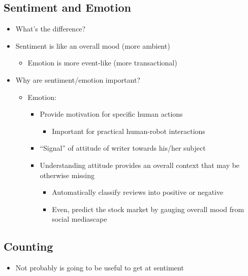 \documentclass[a4paper]{article}
\begin{document}
\subsection{Sentiment and Emotion}
\begin{itemize}
    \item What's the difference?
    \item Sentiment is like an overall mood (more ambient)
    \begin{itemize}[label=$\circ$]
        \item Emotion is more event-like (more transactional)
    \end{itemize}
    \item Why are sentiment/emotion important?
    \begin{itemize}[label=$\circ$]
        \item Emotion:
        \begin{itemize}[label=\tiny$\blacksquare$]
            \item Provide motivation for specific human actions
            \begin{itemize}[label=\tiny$\blacksquare$]
                \item Important for practical human-robot interactions
            \end{itemize}
        \item ``Signal'' of attitude of writer towards his/her subject
        \item Understanding attitude provides an overall context that may be otherwise missing
        \begin{itemize}[label=$\circ$]
            \item Automatically classify reviews into positive or negative
            \item Even, predict the stock market by gauging overall mood from social mediascape
        \end{itemize}
        \end{itemize}
    \end{itemize}
\end{itemize}

\subsection{Counting}
\begin{itemize}
    \item Not probably is going to be useful to get at sentiment
\end{itemize}
\end{document}
